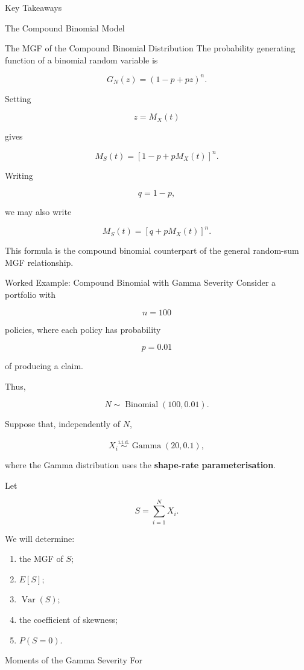 \documentclass[
  ignorenonframetext,
  aspectratio=169,
]{beamer}
\providecommand{\tightlist}{%
  \setlength{\itemsep}{0pt}\setlength{\parskip}{0pt}}
\begin{document}
\begin{frame}{Key Takeaways}
\begin{block}{The Compound Binomial Model}
\begin{block}{The MGF of the Compound Binomial Distribution}
The probability generating function of a binomial random variable is

\[
G_N(z)
=
(1-p+pz)^n.
\]

Setting

\[
z=M_X(t)
\]

gives

\[
\boxed{
M_S(t)
=
[1-p+pM_X(t)]^n.
}
\]

Writing

\[
q=1-p,
\]

we may also write

\[
\boxed{
M_S(t)
=
[q+pM_X(t)]^n.
}
\]

This formula is the compound binomial counterpart of the general
random-sum MGF relationship.
\end{block}
\end{block}

\begin{block}{Worked Example: Compound Binomial with Gamma Severity}
\protect{}\label{worked-example-compound-binomial-with-gamma-severity-1}
Consider a portfolio with

\[
n=100
\]

policies, where each policy has probability

\[
p=0.01
\]

of producing a claim.

Thus,

\[
N\sim\operatorname{Binomial}(100,0.01).
\]

Suppose that, independently of \(N\),

\[
X_i\overset{\text{i.i.d.}}{\sim}\operatorname{Gamma}(20,0.1),
\]

where the Gamma distribution uses the \textbf{shape-rate
parameterisation}.

Let

\[
S=\sum_{i=1}^{N}X_i.
\]

We will determine:

\begin{enumerate}
\tightlist
\item
  the MGF of \(S\);
\item
  \(E[S]\);
\item
  \(\operatorname{Var}(S)\);
\item
  the coefficient of skewness;
\item
  \(P(S=0)\).
\end{enumerate}

\begin{block}{Moments of the Gamma Severity}
\protect{}\label{moments-of-the-gamma-severity}
For


\end{block}
\end{block}
\end{frame}
\end{document}
